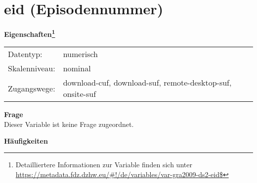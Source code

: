 
    \setcounter{footnote}{0}

    \vspace*{-1.8cm}
	\section{eid (Episodennummer)}
	\label{section:eid}



    \vspace*{0.5cm}
    \noindent\textbf{Eigenschaften\footnote{Detailliertere Informationen zur Variable finden sich unter
		\url{https://metadata.fdz.dzhw.eu/\#!/de/variables/var-gra2009-ds2-eid$}}}\\
	\begin{tabularx}{\hsize}{@{}lX}
	Datentyp: & numerisch \\
	Skalenniveau: & nominal \\
	Zugangswege: &
	  download-cuf, 
	  download-suf, 
	  remote-desktop-suf, 
	  onsite-suf
 \\
    \end{tabularx}



		\vspace*{0.5cm}
		\noindent\textbf{Frage}\\
		Dieser Variable ist keine Frage zugeordnet.





        		\vspace*{0.5cm}
                \noindent\textbf{Häufigkeiten}

